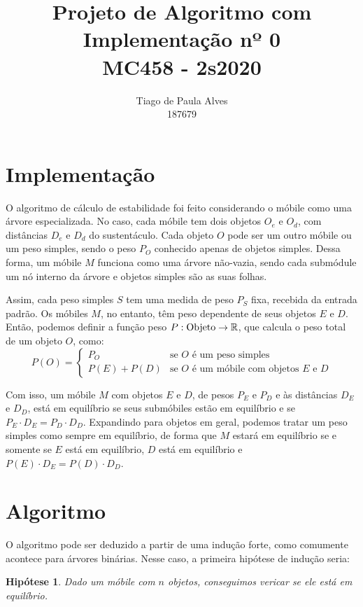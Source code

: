 \documentclass[a4paper, 14pt]{extarticle}
\title{\vspace{-2.5cm}Projeto de Algoritmo com Implementação nº 0 \\ \normalsize MC458 - 2s2020}
\author{Tiago de Paula Alves \\ \small 187679}
\date{}
\newtheorem*{hypothesis}{Hipótese}
\begin{document}
\maketitle

\section{Implementação}

    O algoritmo de cálculo de estabilidade foi feito considerando o móbile como uma árvore especializada. No caso, cada móbile tem dois objetos $O_e$ e $O_d$, com distâncias $D_e$ e $D_d$ do sustentáculo. Cada objeto $O$ pode ser um outro móbile ou um peso simples, sendo o peso $P_O$ conhecido apenas de objetos simples. Dessa forma, um móbile $M$ funciona como uma árvore não-vazia, sendo cada submódule um nó interno da árvore e objetos simples são as suas folhas.

    Assim, cada peso simples $S$ tem uma medida de peso $P_S$ fixa, recebida da entrada padrão. Os móbiles $M$, no entanto, têm peso dependente de seus objetos $E$ e $D$. Então, podemos definir a função peso $P: \text{Objeto} \to \operatorname{\mathbb{R}}$, que calcula o peso total de um objeto $O$, como:
    \[
        P(O) = \begin{cases}
            P_O & \text{se $O$ é um peso simples} \\
            P(E) + P(D) & \text{se $O$ é um móbile com objetos $E$ e $D$}
        \end{cases}
    \]

    Com isso, um móbile $M$ com objetos $E$ e $D$, de pesos $P_E$ e $P_D$ e às distâncias $D_E$ e $D_D$, está em equilíbrio se seus submóbiles estão em equilíbrio e se $P_E \cdot D_E = P_D \cdot D_D$. Expandindo para objetos em geral, podemos tratar um peso simples como sempre em equilíbrio, de forma que $M$ estará em equilíbrio se e somente se $E$ está em equilíbrio, $D$ está em equilíbrio e $P(E) \cdot D_E = P(D) \cdot D_D$.

\section{Algoritmo}

    O algoritmo pode ser deduzido a partir de uma indução forte, como comumente acontece para árvores binárias. Nesse caso, a primeira hipótese de indução seria:

    \begin{hypothesis}
        Dado um móbile com $n$ objetos, conseguimos vericar se ele está em equilíbrio.
    \end{hypothesis}
\end{document}
